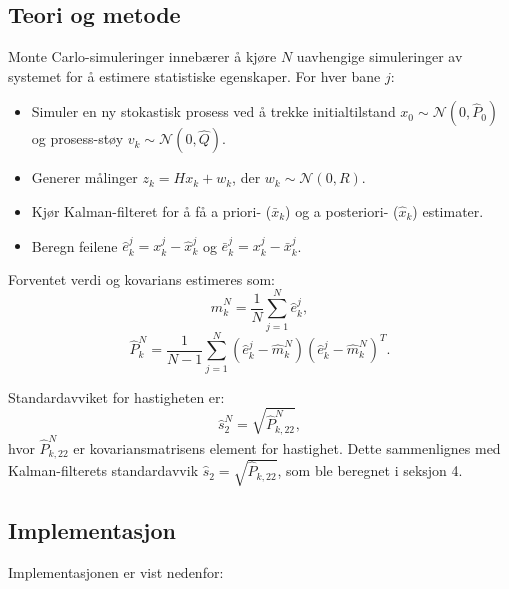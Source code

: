 \documentclass[a4paper,12pt]{article}
\theoremstyle{plain}
\begin{document}
\subsection{Teori og metode}
Monte Carlo-simuleringer innebærer å kjøre $N$ uavhengige simuleringer av systemet for å estimere statistiske egenskaper. For hver bane $j$:
\begin{itemize}
    \item Simuler en ny stokastisk prosess ved å trekke initialtilstand $x_0 \sim \mathcal{N}(0, \hat{P}_0)$ og prosess-støy $v_k \sim \mathcal{N}(0, \hat{Q})$.
    \item Generer målinger $z_k = H x_k + w_k$, der $w_k \sim \mathcal{N}(0, R)$.
    \item Kjør Kalman-filteret for å få a priori- ($\bar{x}_k$) og a posteriori- ($\hat{x}_k$) estimater.
    \item Beregn feilene $\hat{e}_k^j = x_k^j - \hat{x}_k^j$ og $\bar{e}_k^j = x_k^j - \bar{x}_k^j$.
\end{itemize}

Forventet verdi og kovarians estimeres som:
\begin{equation}
\hat{m}_k^N = \frac{1}{N} \sum_{j=1}^N \hat{e}_k^j,
\end{equation}
\begin{equation}
\hat{P}_k^N = \frac{1}{N-1} \sum_{j=1}^N (\hat{e}_k^j - \hat{m}_k^N)(\hat{e}_k^j - \hat{m}_k^N)^T.
\end{equation}

Standardavviket for hastigheten er:
\begin{equation}
\hat{s}_2^N = \sqrt{\hat{P}_{k,22}^N},
\end{equation}
hvor $\hat{P}_{k,22}^N$ er kovariansmatrisens element for hastighet. Dette sammenlignes med Kalman-filterets standardavvik $\hat{s}_2 = \sqrt{\hat{P}_{k,22}}$, som ble beregnet i seksjon 4.
\clearpage
\subsection{Implementasjon}
Implementasjonen er vist nedenfor:
\end{document}
